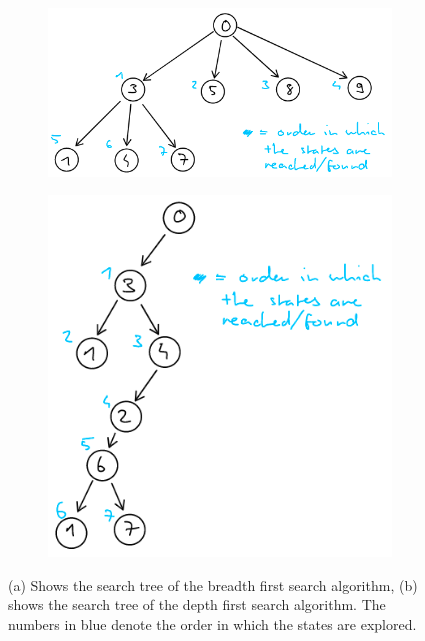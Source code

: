 \documentclass[12pt]{article}
\begin{document}
\begin{figure}[h!]
    \begin{subfigure}{0.5\textwidth}
        \centering
        \includegraphics[width=\textwidth]{sheet02_3a.png}
        \caption{}
    \end{subfigure}
    \begin{subfigure}{0.5\textwidth}
        \centering
        \includegraphics[width=\textwidth]{sheet02_3b.png}
        \caption{}
    \end{subfigure}
    \caption{(a) Shows the search tree of the breadth first search algorithm, (b) shows the search tree of the depth first search algorithm. The numbers in blue denote the order in which the states are explored.}
\end{figure}
\end{document}
